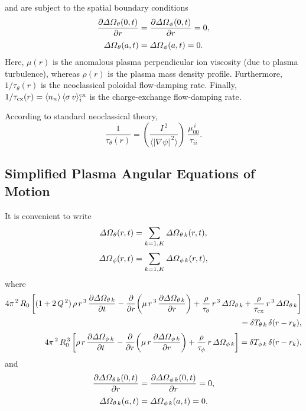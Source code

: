 \documentclass[notitlepage,12pt]{article}
\begin{document}
and are subject to the spatial boundary conditions
\begin{align}
\frac{\partial{\mit\Delta\Omega}_\theta(0,t)}{\partial r} &=
\frac{\partial{\mit\Delta\Omega}_\phi(0,t)}{\partial r} =0,\\[0.5ex]
{\mit\Delta\Omega}_\theta(a,t)&={\mit\Delta\Omega}_\phi(a,t)=0.
\end{align}
Here, $\mu(r)$ is the anomalous plasma perpendicular ion viscosity (due to plasma turbulence),
whereas 
$\rho(r)$ 
 is the plasma mass density profile. 
Furthermore, $1/\tau_\theta(r)$
is  the neoclassical poloidal flow-damping rate.
Finally, $1/\tau_{\rm cx}(r)= \langle n_n\rangle\,\langle\sigma\,v\rangle_i^{\rm cx}$ is  the charge-exchange flow-damping rate. 

 According to 
standard neoclassical theory, 
\begin{equation}\label{c7}
\frac{1}{\tau_\theta(r)} = \left(\frac{I^{\,2}}{\langle |\nabla\psi|^{\,2}\rangle}\right)\
\frac{\mu_{00}^{\,i}}{\tau_{ii}}.
\end{equation}

\subsection{Simplified Plasma Angular Equations of Motion}
It is convenient to write
\begin{align}
{\mit\Delta\Omega}_\theta(r,t) &= \sum_{k=1,K} {\mit\Delta\Omega}_{\theta\,k}(r,t),\\[0.5ex]
{\mit\Delta\Omega}_\phi(r,t) &= \sum_{k=1,K} {\mit\Delta\Omega}_{\phi\,k}(r,t),
\end{align}
where 
\begin{align}\label{e84}
 4\pi^{\,2}\,R_0\left[(1+2\,Q^{\,2})\,\rho\,r^{\,3}\,\frac{\partial{\mit\Delta\Omega}_{\theta\,k}}{\partial t}-\frac{\partial}{\partial r}\!\left(
\mu\,r^{\,3}\,\frac{\partial{\mit\Delta\Omega}_{\theta\,k}}{\partial r}\right)
 +\frac{\rho}{\tau_{\theta}}\,r^{\,3}\,{\mit\Delta\Omega}_{\theta\,k}
+\frac{\rho}{\tau_{\rm cx}}\,r^{\,3}\,{\mit\Delta\Omega}_{\theta\,k}\right]\nonumber\\[0.5ex]\phantom{==}=\delta T_{\theta\,k}\,\delta (r-r_k),\\[0.5ex]
 4\pi^{\,2}\,R_0^{\,3}\left[\rho\,r\,\frac{\partial{\mit\Delta\Omega}_{\phi\,k}}{\partial t}-\frac{\partial}{\partial r}\!\left(
\mu\,r\,\frac{\partial{\mit\Delta\Omega}_{\phi\,k}}{\partial r}\right) +\frac{\rho}{\tau_{\phi}}\,r\,{\mit\Delta\Omega}_{\phi\,k}\right]
= \delta T_{\phi\,k}\,\delta(r-r_k),\label{e85}
\end{align}
and 
\begin{align}
\frac{\partial{\mit\Delta\Omega}_{\theta\,k}(0,t)}{\partial r} &=
\frac{\partial{\mit\Delta\Omega}_{\phi\,k}(0,t)}{\partial r} =0,\\[0.5ex]
{\mit\Delta\Omega}_{\theta\,k}(a,t)&={\mit\Delta\Omega}_{\phi\,k}(a,t)=0.
\end{align}
\end{document}
